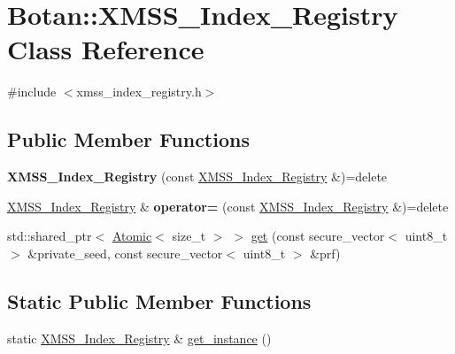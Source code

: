 \hypertarget{class_botan_1_1_x_m_s_s___index___registry}{}\section{Botan\+:\+:X\+M\+S\+S\+\_\+\+Index\+\_\+\+Registry Class Reference}
\label{class_botan_1_1_x_m_s_s___index___registry}


{\ttfamily \#include $<$xmss\+\_\+index\+\_\+registry.\+h$>$}

\subsection*{Public Member Functions}
\begin{DoxyCompactItemize}
\item 
\mbox{\label{class_botan_1_1_x_m_s_s___index___registry_add9f8d6bd8f776b4ffaa8b446a28a918}} 
{\bfseries X\+M\+S\+S\+\_\+\+Index\+\_\+\+Registry} (const \hyperlink{class_botan_1_1_x_m_s_s___index___registry}{X\+M\+S\+S\+\_\+\+Index\+\_\+\+Registry} \&)=delete
\item 
\mbox{\label{class_botan_1_1_x_m_s_s___index___registry_a83a4bf4d25f6a03e25021aeff1e32684}} 
\hyperlink{class_botan_1_1_x_m_s_s___index___registry}{X\+M\+S\+S\+\_\+\+Index\+\_\+\+Registry} \& {\bfseries operator=} (const \hyperlink{class_botan_1_1_x_m_s_s___index___registry}{X\+M\+S\+S\+\_\+\+Index\+\_\+\+Registry} \&)=delete
\item 
std\+::shared\+\_\+ptr$<$ \hyperlink{class_botan_1_1_atomic}{Atomic}$<$ size\+\_\+t $>$ $>$ \hyperlink{class_botan_1_1_x_m_s_s___index___registry_a7b756b7d8a02f2185da9c7c8d4fd8b01}{get} (const secure\+\_\+vector$<$ uint8\+\_\+t $>$ \&private\+\_\+seed, const secure\+\_\+vector$<$ uint8\+\_\+t $>$ \&prf)
\end{DoxyCompactItemize}
\subsection*{Static Public Member Functions}
\begin{DoxyCompactItemize}
\item 
static \hyperlink{class_botan_1_1_x_m_s_s___index___registry}{X\+M\+S\+S\+\_\+\+Index\+\_\+\+Registry} \& \hyperlink{class_botan_1_1_x_m_s_s___index___registry_a1f1342ed0b520a67ae8165d3cf0e989e}{get\+\_\+instance} ()
\end{DoxyCompactItemize}


